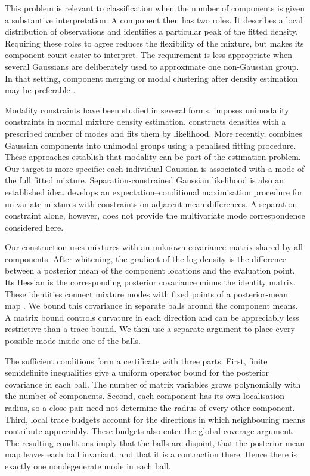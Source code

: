 \documentclass[12pt,a4paper]{article}
\theoremstyle{remark}
\begin{document}
This problem is relevant to classification when the number of components is given a substantive interpretation. A component then has two roles. It describes a local distribution of observations and identifies a particular peak of the fitted density. Requiring these roles to agree reduces the flexibility of the mixture, but makes its component count easier to interpret. The requirement is less appropriate when several Gaussians are deliberately used to approximate one non-Gaussian group. In that setting, component merging or modal clustering after density estimation may be preferable \citep{hennig2010,chacon2019,scrucca2021}.

Modality constraints have been studied in several forms. \citet{bartolucci2005} imposes unimodality constraints in normal mixture density estimation. \citet{dasgupta2021} constructs densities with a prescribed number of modes and fits them by likelihood. More recently, \citet{tancini2025} combines Gaussian components into unimodal groups using a penalised fitting procedure. These approaches establish that modality can be part of the estimation problem. Our target is more specific: each individual Gaussian is associated with a mode of the full fitted mixture. Separation-constrained Gaussian likelihood is also an established idea. \citet{jiang2023} develops an expectation--conditional maximisation procedure for univariate mixtures with constraints on adjacent mean differences. A separation constraint alone, however, does not provide the multivariate mode correspondence considered here.

Our construction uses mixtures with an unknown covariance matrix shared by all components. After whitening, the gradient of the log density is the difference between a posterior mean of the component locations and the evaluation point. Its Hessian is the corresponding posterior covariance minus the identity matrix. These identities connect mixture modes with fixed points of a posterior-mean map \citep{carreira2000,ray2005}. We bound this covariance in separate balls around the component means. A matrix bound controls curvature in each direction and can be appreciably less restrictive than a trace bound. We then use a separate argument to place every possible mode inside one of the balls.

The sufficient conditions form a certificate with three parts. First, finite semidefinite inequalities give a uniform operator bound for the posterior covariance in each ball. The number of matrix variables grows polynomially with the number of components. Second, each component has its own localisation radius, so a close pair need not determine the radius of every other component. Third, local trace budgets account for the directions in which neighbouring means contribute appreciably. These budgets also enter the global coverage argument. The resulting conditions imply that the balls are disjoint, that the posterior-mean map leaves each ball invariant, and that it is a contraction there. Hence there is exactly one nondegenerate mode in each ball.
\end{document}

